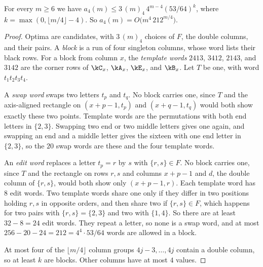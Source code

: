 \begin{theorem}\label{thm:foursurvival}
For every $m\ge6$ we have $a_4(m)\le3\,(m)_4\,4^{m-4}(53/64)^k$, where
$k=\max(0,\lfloor m/4\rfloor-4)$. So $a_4(m)=O\bigl(m^4\,212^{m/4}\bigr)$.
\end{theorem}

\begin{proof}
Optima are candidates, with $3\,(m)_4$ choices of $F$, the double columns, and their
pairs. A \emph{block} is a run of four singleton columns, whose word lists
their black rows. For a block from column $x$, the \emph{template words} $2413$,
$3412$, $2143$, and $3142$ are the corner rows of $\kC_x$, $\kA_x$, $\kE_x$, and $\kB_x$. Let
$T$ be one, with word $t_1t_2t_3t_4$.

A \emph{swap word} swaps two letters $t_p$ and $t_q$. No block carries one, since $T$ and
the axis-aligned rectangle on $(x+p-1,t_p)$ and $(x+q-1,t_q)$ would both show exactly these
two points. Template words are the permutations with both end letters in $\{2,3\}$.
Swapping two end or two middle letters gives one again, and swapping an end
and a middle letter gives the sixteen with one end letter in $\{2,3\}$, so the $20$ swap words are these and the four template words.

An \emph{edit word} replaces a letter $t_p=r$ by $s$ with $\{r,s\}\in F$. No block carries
one, since $T$ and the rectangle on rows $r,s$ and columns $x+p-1$ and $d$, the double column
of $\{r,s\}$, would both show only $(x+p-1,r)$. Each template word has $8$ edit words.
Two template words share one only if they differ in two positions holding $r,s$ in opposite
orders, and then share two if $\{r,s\}\in F$, which happens for two pairs with
$\{r,s\}=\{2,3\}$ and two with $\{1,4\}$. So there are at least $32-8=24$ edit words. They repeat a letter, so none is a swap word, and at most
$256-20-24=212=4^4\cdot53/64$ words are allowed in a block.

At most four of the $\lfloor m/4\rfloor$ column groups $4j-3,\ldots,4j$ contain a double
column, so at least $k$ are blocks. Other columns have at most $4$ values.
\end{proof}

